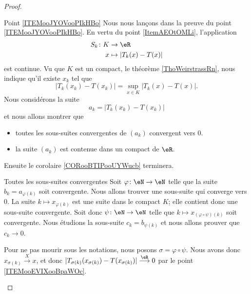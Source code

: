 \begin{proof}
\begin{subproof}
    \item[Point \ref{ITEMooJYOVooPIkHBo}]
    Nous nous lançons dans la preuve du point \ref{ITEMooJYOVooPIkHBo}. En vertu du point \ref{ItemAEOtOMLi}, l'application 
    \begin{equation}
        \begin{aligned}
            S_k\colon K&\to \eR \\
            x&\mapsto | T_k(x)-T(x) | 
        \end{aligned}
    \end{equation}
    est continue. Vu que \( K\) est un compact, le théorème \ref{ThoWeirstrassRn}, nous indique qu'il existe \( x_k\) tel que
    \begin{equation}
        | T_k(x_k)-T(x_k) |=\sup_{x\in K}| T_k(x)-T(x) |.
    \end{equation}
    Nous considérons la suite
    \begin{equation}
        a_k=| T_k(x_k)-T(x_k) |
    \end{equation}
    et nous allons montrer que 
    \begin{itemize}
        \item toutes les sous-suites convergentes de \( (a_k)\) convergent vers \( 0\).
        \item la suite \( (a_k)\) est contenue dans un compact de \( \eR\).
    \end{itemize}
    Ensuite le corolaire \ref{CORooBTIPooUYWucb} terminera.
    \begin{subproof}

    \item[Toutes les sous-suites convergentes]
        Soit \( \varphi\colon \eN\to \eN\) telle que la suite \( b_k=a_{\varphi(k)}\) soit convergente. Nous allons trouver une sous-suite qui converge vers \( 0\).  La suite \( k\mapsto x_{\varphi(k)}\) est une suite dans le compact \( K\); elle contient donc une sous-suite convergente. Soit donc \( \psi\colon \eN\to \eN\) telle que \( k\mapsto x_{(\varphi\circ\psi)(k)}\) soit convergente. Nous étudions la sous-suite \( c_k=b_{\psi(k)}\) et nous allons prouver que \( c_k\to 0\).

        Pour ne pas mourir sous les notations, nous posons \( \sigma=\varphi\circ\psi\). Nous avons donc \( x_{\sigma(k)}\stackrel{X}{\longrightarrow}x\), et donc  \( | T_{\sigma(k)}(x_{\sigma(k)})-T(x_{\sigma(k)}) |\stackrel{\eR}{\longrightarrow}0\) par le point \ref{ITEMooEVIXooBpaWOc}.



\end{subproof}
\end{subproof}
\end{proof}
